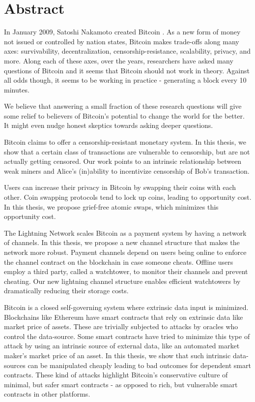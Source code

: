 
\chapter*{Abstract}

In January 2009, Satoshi Nakamoto created Bitcoin \cite{bitcoin_whitepaper}. As a new form of money not issued or controlled by nation states, Bitcoin makes trade-offs along many axes: survivability, decentralization, censorship-resistance, scalability, privacy, and more. Along each of these axes, over the years, researchers have asked many questions of Bitcoin and it seems that Bitcoin should not work in theory. Against all odds though, it seems to be working in practice - generating a block every 10 minutes.

We believe that answering a small fraction of these research questions will give some relief to believers of Bitcoin's potential to change the world for the better. It might even nudge honest skeptics towards asking deeper questions.

Bitcoin claims to offer a censorship-resistant monetary system. In this thesis, we show that a certain class of transactions are vulnerable to censorship, but are not actually getting censored. Our work points to an intrinsic relationship between weak miners and Alice's (in)ability to incentivize censorship of Bob's transaction.

Users can increase their privacy in Bitcoin by swapping their coins with each other. Coin swapping protocols tend to lock up coins, leading to opportunity cost. In this thesis, we propose grief-free atomic swaps, which minimizes this opportunity cost. 

The Lightning Network scales Bitcoin as a payment system by having a network of channels. In this thesis, we propose a new channel structure that makes the network more robust. Payment channels depend on users being online to enforce the channel contract on the blockchain in case someone cheats. Offline users employ a third party, called a watchtower, to monitor their channels and prevent cheating. Our new lightning channel structure enables efficient watchtowers by dramatically reducing their storage costs. 

Bitcoin is a closed self-governing system where extrinsic data input is minimized. Blockchains like Ethereum have smart contracts that rely on extrinsic data like market price of assets. These are trivially subjected to attacks by oracles who control the data-source. Some smart contracts have tried to minimize this type of attack by using an intrinsic source of external data, like an automated market maker's market price of an asset. In this thesis, we show that such intrinsic data-sources can be manipulated cheaply leading to bad outcomes for dependent smart contracts. These kind of attacks highlight Bitcoin's conservative culture of minimal, but safer smart contracts - as opposed to rich, but vulnerable smart contracts in other platforms.